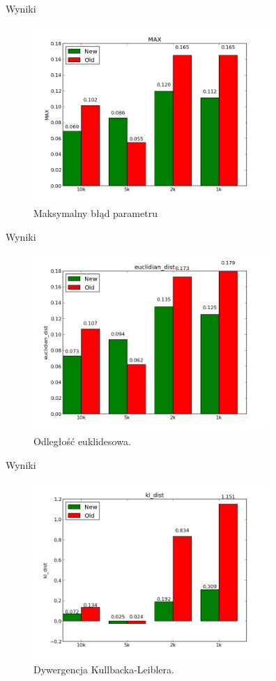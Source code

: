 \documentclass{beamer}
\begin{document}
\begin{frame}{Wyniki}
	\begin{figure}[h!]
		\centering
		\includegraphics[width=9cm]{max.png}
		\caption{Maksymalny błąd parametru}
	\end{figure}
\end{frame}

\begin{frame}{Wyniki}
	\begin{figure}[h!]
		\centering
		\includegraphics[width=9cm]{euclidian_dist.png}
		\caption{Odległość euklidesowa.}
	\end{figure}
\end{frame}

\begin{frame}{Wyniki}
	\begin{figure}[h!]
		\centering
		\includegraphics[width=9cm]{kl_dist.png}
		\caption{Dywergencja Kullbacka-Leiblera.}
	\end{figure}
\end{frame}
\end{document}
